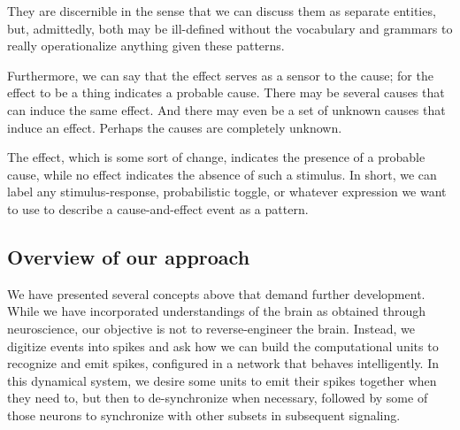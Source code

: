 They are discernible in the sense that we can discuss them as separate entities, but, admittedly, both may be ill-defined without the vocabulary and grammars to really operationalize anything given these patterns.


Furthermore, we can say that the effect serves as a sensor to the cause; for the effect to be a thing indicates a probable cause.
There may be several causes that can induce the same effect.
And there may even be a set of unknown causes that induce an effect.
Perhaps the causes are completely unknown.



The effect, which is some sort of change, indicates the presence of a probable cause, 
while no effect indicates the absence of such a stimulus.
In short, we can label any stimulus-response, probabilistic toggle, or whatever expression we want to use to describe a cause-and-effect event as a pattern.


\subsection{Overview of our approach}

We have presented several concepts above that demand further development.
While we have incorporated understandings of the brain as obtained through neuroscience, our objective is not to reverse-engineer the brain.
Instead, we digitize events into spikes and ask how we can build the computational units to recognize and emit spikes, configured in a network that behaves intelligently.
In this dynamical system, we desire some units to emit their spikes together when they need to, but then to de-synchronize when necessary, followed by some of those neurons to synchronize with other subsets in subsequent signaling.
